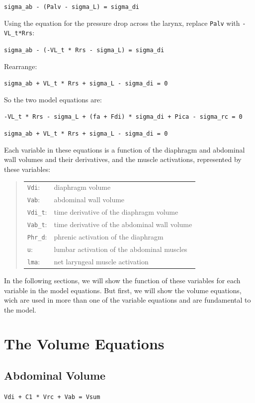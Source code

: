 \documentclass[12pt,openany,oneside]{book}
\newcommand{\ticode}[1]{\texttt{#1}}
\begin{document}
\ticode{sigma\_ab - (Palv - sigma\_L) = sigma\_di}

Using the equation for the pressure drop across the larynx, replace
\ticode{Palv} with \ticode{-VL\_t*Rrs}:

\ticode{sigma\_ab - (-VL\_t * Rrs - sigma\_L) = sigma\_di}

Rearrange:

\ticode{sigma\_ab + VL\_t * Rrs + sigma\_L - sigma\_di = 0}


So the two model equations are:

\ticode{-VL\_t * Rrs - sigma\_L + (fa + Fdi) * sigma\_di + Pica - sigma\_rc = 0}

\ticode{sigma\_ab + VL\_t * Rrs + sigma\_L - sigma\_di = 0}


Each variable in these equations is a function of the diaphragm and
abdominal wall volumes and their derivatives, and the muscle
activations, represented by these variables:
\begin{quote}
\begin{tabular}{@{}ll@{}}
\ticode{Vdi}:&   diaphragm volume\\
\ticode{Vab}:&   abdominal wall volume\\
\ticode{Vdi\_t}:& time derivative of the diaphragm volume\\
\ticode{Vab\_t}:& time derivative of the abdominal wall volume\\
\ticode{Phr\_d}:& phrenic activation of the diaphragm\\
\ticode{u}:&     lumbar activation of the abdominal muscles\\
\ticode{lma}:&   net laryngeal muscle activation
\end{tabular}
\end{quote}

In the following sections, we will show the function of these
variables for each variable in the model equations.  But first, we
will show the volume equations, wich are used in more than one of the
variable equations and are fundamental to the model.

\section{The Volume Equations}
\label{The Volume Equations}

\subsection{Abdominal Volume}
\label{abdominal volume}
\ticode{Vdi + C1 * Vrc + Vab = Vsum}
\end{document}
